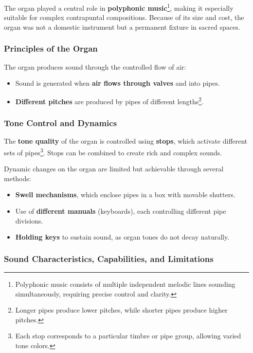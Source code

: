 \documentclass[math,code]{amznotes}
\theoremstyle{remark}
\begin{document}
The organ played a central role in \textbf{polyphonic music}\footnote{Polyphonic music consists of multiple independent melodic lines sounding simultaneously, requiring precise control and clarity.}, making it especially suitable for complex contrapuntal compositions. Because of its size and cost, the organ was not a domestic instrument but a permanent fixture in sacred spaces.

\subsubsection{Principles of the Organ}

The organ produces sound through the controlled flow of air:

\begin{itemize}
    \item Sound is generated when \textbf{air flows through valves} and into pipes.
    \item \textbf{Different pitches} are produced by pipes of different lengths\footnote{Longer pipes produce lower pitches, while shorter pipes produce higher pitches.}.
\end{itemize}

\subsubsection{Tone Control and Dynamics}

The \textbf{tone quality} of the organ is controlled using \textbf{stops}, which activate different sets of pipes\footnote{Each stop corresponds to a particular timbre or pipe group, allowing varied tone colors.}. Stops can be combined to create rich and complex sounds.

Dynamic changes on the organ are limited but achievable through several methods:
\begin{itemize}
    \item \textbf{Swell mechanisms}, which enclose pipes in a box with movable shutters.
    \item Use of \textbf{different manuals} (keyboards), each controlling different pipe divisions.
    \item \textbf{Holding keys} to sustain sound, as organ tones do not decay naturally.
\end{itemize}

\subsubsection{Sound Characteristics, Capabilities, and Limitations}
\end{document}
